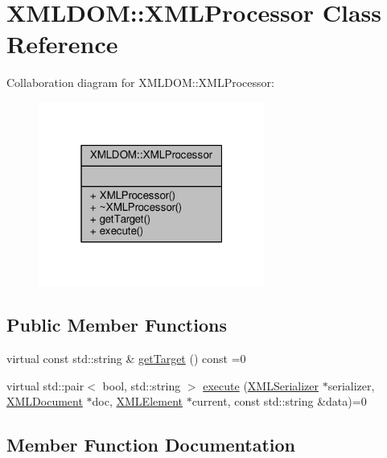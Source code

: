 \hypertarget{classXMLDOM_1_1XMLProcessor}{}\section{X\+M\+L\+D\+OM\+:\+:X\+M\+L\+Processor Class Reference}
\label{classXMLDOM_1_1XMLProcessor}


Collaboration diagram for X\+M\+L\+D\+OM\+:\+:X\+M\+L\+Processor\+:
\nopagebreak
\begin{figure}[H]
\begin{center}
\leavevmode
\includegraphics[width=211pt]{d0/daf/classXMLDOM_1_1XMLProcessor__coll__graph}
\end{center}
\end{figure}
\subsection*{Public Member Functions}
\begin{DoxyCompactItemize}
\item 
virtual const std\+::string \& \hyperlink{classXMLDOM_1_1XMLProcessor_a1999a89e597d5db3334859a9e41f4ac8}{get\+Target} () const =0
\item 
virtual std\+::pair$<$ bool, std\+::string $>$ \hyperlink{classXMLDOM_1_1XMLProcessor_a72f5da76763e3f7ed1a17d9e8bf0af3b}{execute} (\hyperlink{classXMLDOM_1_1XMLSerializer}{X\+M\+L\+Serializer} $\ast$serializer, \hyperlink{classXMLDOM_1_1XMLDocument}{X\+M\+L\+Document} $\ast$doc, \hyperlink{classXMLDOM_1_1XMLElement}{X\+M\+L\+Element} $\ast$current, const std\+::string \&data)=0
\end{DoxyCompactItemize}


\subsection{Member Function Documentation}
